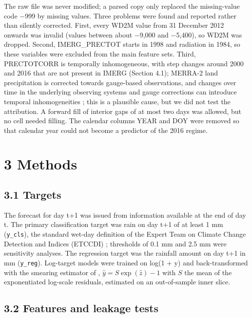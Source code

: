 \documentclass[
]{article}
\begin{document}
The raw file was never modified; a parsed copy only replaced the missing-value code $-$999 by missing values. Three problems were found and reported rather than silently corrected. First, every WD2M value from 31 December 2012 onwards was invalid (values between about $-$9,000 and $-$5,400), so WD2M was dropped. Second, IMERG\_PRECTOT starts in 1998 and radiation in 1984, so these variables were excluded from the main feature sets. Third, PRECTOTCORR is temporally inhomogeneous, with step changes around 2000 and 2016 that are not present in IMERG (Section 4.1); MERRA-2 land precipitation is corrected towards gauge-based observations, and changes over time in the underlying observing systems and gauge corrections can introduce temporal inhomogeneities \citep{reichle2017}; this is a plausible cause, but we did not test the attribution. A forward fill of interior gaps of at most two days was allowed, but no cell needed filling. The calendar columns YEAR and DOY were removed so that calendar year could not become a predictor of the 2016 regime.

\hypertarget{methods}{%
\section{3 Methods}\label{methods}}

\hypertarget{targets}{%
\subsection{3.1 Targets}\label{targets}}

The forecast for day t+1 was issued from information available at the end of day t. The primary classification target was rain on day t+1 of at least 1 mm (\texttt{y\_cls}), the standard wet-day definition of the Expert Team on Climate Change Detection and Indices (ETCCDI) \citep{zhang2011}; thresholds of 0.1 mm and 2.5 mm were sensitivity analyses. The regression target was the rainfall amount on day t+1 in mm (\texttt{y\_reg}). Log-target models were trained on log(1 + y) and back-transformed with the smearing estimator of \citet{duan1983}, \(\hat y = S \exp(\hat z) - 1\) with \(S\) the mean of the exponentiated log-scale residuals, estimated on an out-of-sample inner slice.

\hypertarget{features-and-leakage-tests}{%
\subsection{3.2 Features and leakage tests}\label{features-and-leakage-tests}}
\end{document}
